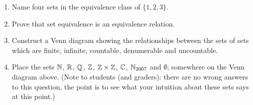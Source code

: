 \begin{enumerate}
\item Name four sets in the equivalence class of $\{1, 2, 3\}$.
\item Prove that set equivalence is an equivalence relation.
\item Construct a Venn diagram showing the relationships between the sets of
sets which are finite, infinite, countable, denumerable and uncountable.
\item Place the sets ${\mathbb N}$, ${\mathbb R}$, ${\mathbb Q}$, ${\mathbb Z}$, ${\mathbb Z} \times {\mathbb Z}$, ${\mathbb C}$, ${\mathbb N}_{2007}$ and $\emptyset$; 
somewhere on the Venn diagram above. (Note to students (and graders): 
there are no wrong answers to this question, the point is to see what 
your intuition about these sets says at this point.)
\end{enumerate}
 

